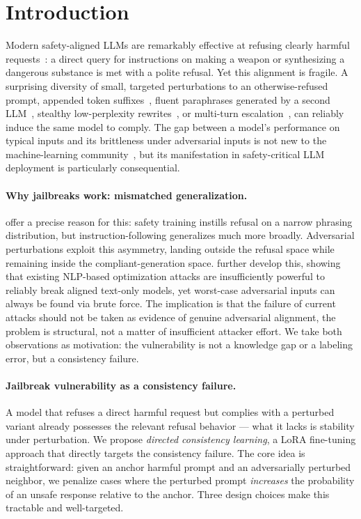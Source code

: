 \documentclass{article}
\begin{document}
\section{Introduction}
\label{sec:introduction}
Modern safety-aligned LLMs are remarkably effective at refusing clearly harmful requests~\cite{ouyang2022instructgpt,touvron2023llama2}: a direct query for instructions on making a weapon or synthesizing a dangerous substance is met with a polite refusal. Yet this alignment is fragile. A surprising diversity of small, targeted perturbations to an otherwise-refused prompt, appended token suffixes~\cite{zou2023gcg}, fluent paraphrases generated by a second LLM~\cite{chao2023pair,mehrotra2023tap}, stealthy low-perplexity rewrites~\cite{liu2024autodan}, or multi-turn escalation~\cite{russinovich2024crescendo}, can reliably induce the same model to comply. The gap between a model's performance on typical inputs and its brittleness under adversarial inputs is not new to the machine-learning community~\cite{madry2018pgd}, but its manifestation in safety-critical LLM deployment is particularly consequential.


\paragraph{Why jailbreaks work: mismatched generalization.}
\citet{wei2023jailbroken} offer a precise reason for this: safety training instills refusal on a narrow phrasing distribution, but instruction-following generalizes much more broadly. Adversarial perturbations exploit this asymmetry, landing outside the refusal space while remaining inside the compliant-generation space. \citet{carlini2023adversarially} further develop this, showing that  existing NLP-based optimization attacks are insufficiently powerful to reliably break aligned text-only models, yet worst-case adversarial inputs can always be found via brute force. The implication is that the failure of current attacks should not be taken as evidence of genuine adversarial alignment, the problem is structural, not a  matter of insufficient attacker effort. We take both observations as motivation: the vulnerability is not a knowledge gap or a labeling error, but a consistency failure.



\paragraph{Jailbreak vulnerability as a consistency failure.}
A model that refuses a direct harmful request but complies with a perturbed variant already possesses the relevant refusal behavior — what it lacks is stability under perturbation. We propose \emph{directed consistency learning}, a LoRA fine-tuning approach that directly targets the consistency failure. The core idea is straightforward: given an anchor harmful prompt and an adversarially perturbed neighbor, we penalize cases where the perturbed prompt \emph{increases} the probability of an unsafe response relative to the anchor. Three design choices make this tractable and well-targeted.
\end{document}
